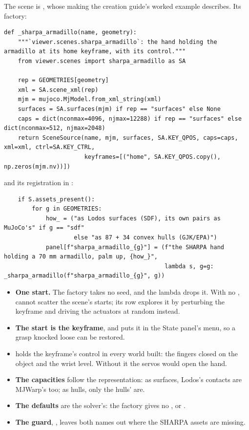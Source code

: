 The scene is , whose making the creation guide's worked example describes. Its factory:

\begin{lstlisting}
def _sharpa_armadillo(name, geometry):
    """`viewer.scenes.sharpa_armadillo`: the hand holding the armadillo at its home keyframe, with its control."""
    from viewer.scenes import sharpa_armadillo as SA

    rep = GEOMETRIES[geometry]
    xml = SA.scene_xml(rep)
    mjm = mujoco.MjModel.from_xml_string(xml)
    surfaces = SA.surfaces(mjm) if rep == "surfaces" else None
    caps = dict(nconmax=4096, njmax=12288) if rep == "surfaces" else dict(nconmax=512, njmax=2048)
    return SceneSource(name, mjm, surfaces, SA.KEY_QPOS, caps=caps, xml=xml, ctrl=SA.KEY_CTRL,
                       keyframes=[("home", SA.KEY_QPOS.copy(), np.zeros(mjm.nv))])
\end{lstlisting}

and its registration in :

\begin{lstlisting}
    if S.assets_present():
        for g in GEOMETRIES:
            how_ = ("as Lodos surfaces (SDF), its own pairs as MuJoCo's" if g == "sdf"
                    else "as 87 + 34 convex hulls (GJK/EPA)")
            panel[f"sharpa_armadillo_{g}"] = (f"the SHARPA hand holding a 70 mm armadillo, palm up, {how_}",
                                              lambda s, g=g: _sharpa_armadillo(f"sharpa_armadillo_{g}", g))
\end{lstlisting}

\begin{itemize}
\item \textbf{One start.} The factory takes no seed, and the lambda drops it. With no ,  cannot scatter the scene's starts; its  row explores it by perturbing the keyframe and driving the actuators at random instead.
\item \textbf{The start is the keyframe}, and  puts it in the State panel's menu, so a grasp knocked loose can be restored.
\item \textbf{} holds the keyframe's control in every world built: the fingers closed on the object and the wrist level. Without it the servos would open the hand.
\item \textbf{The capacities} follow the representation: as surfaces, Lodos's contacts are MJWarp's too; as hulls, only the hulls' are.
\item \textbf{The defaults} are the solver's: the factory gives no ,  or .
\item \textbf{The guard}, , leaves both names out where the SHARPA assets are missing.
\end{itemize}

